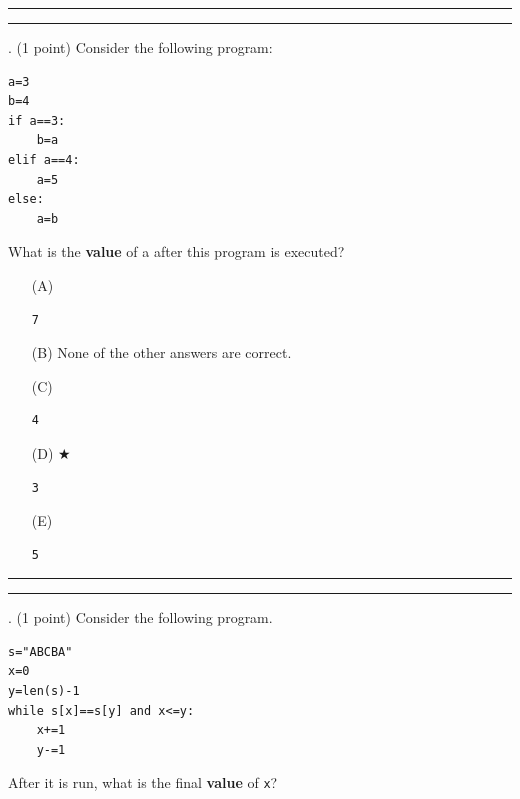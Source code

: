 \documentclass{article}
\begin{document}
\vspace*{2em}
\hrule
\vspace{2em}

\vspace{2em}
\hrule height 2pt


\newpage
{}. (1 point)
Consider the following program:
\begin{verbatim}
a=3
b=4
if a==3:
    b=a
elif a==4:
    a=5
else:
    a=b
\end{verbatim}
What is the \textbf{value} of a after this program is executed?


\begin{enumerate}
\item[(A)]
\begin{verbatim}7\end{verbatim}

\item[(B)]
None of the other answers are correct.

\item[(C)]
\begin{verbatim}4\end{verbatim}

\item[(D)] $\bigstar$ 
\begin{verbatim}3\end{verbatim}

\item[(E)]
\begin{verbatim}5\end{verbatim}

\end{enumerate}

\vspace*{2em}
\hrule
\vspace{2em}

\vspace{2em}
\hrule height 2pt


\newpage
{}. (1 point)
Consider the following program.
\begin{verbatim}
s="ABCBA"
x=0
y=len(s)-1
while s[x]==s[y] and x<=y:
    x+=1
    y-=1
\end{verbatim}
After it is run, what is the final \textbf{value} of \texttt{x}?
\end{document}
